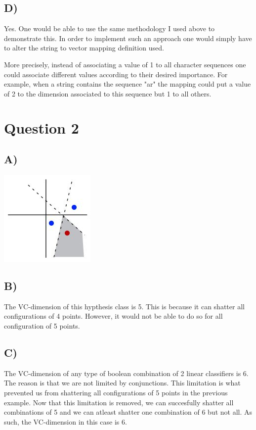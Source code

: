 \documentclass{report}
\begin{document}
\subsection*{D)}
Yes. One would be able to use the same methodology I used above to demonstrate this.
In order to implement such an approach one would simply have to alter the string to vector
mapping definition used.

More precisely, instead of associating a value of 1 to all character
sequences one could associate different values according to their desired importance. For
example, when a string contains the sequence "ar" the mapping could put a value of 2
to the dimension associated to this sequence but 1 to all others.

\section*{Question 2}
\subsection*{A)}
\includegraphics[width=175px, keepaspectratio]{3points.jpg}
\subsection*{B)}
The VC-dimension of this hypthesis class is 5. This is because it can
shatter all configurations of 4 points. However, it would not be able to do so for all
configuration of 5 points.
\subsection*{C)}
The VC-dimension of any type of boolean combination of 2 linear classifiers is
6. The reason is that we are not limited by conjunctions. This limitation is what
prevented us from shattering all configurations of 5 points in the previous example.
Now that this limitation is removed, we can succesfully shatter all combinations of 5
and we can atleast shatter one combination of 6 but not all. As such, the VC-dimension
in this case is 6.
\end{document}
